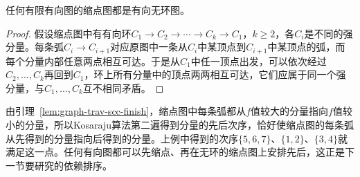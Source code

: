 \begin{theorem}[缩点图无环]
\label{thm:graph-trav-condensation-dag}
任何有限有向图的缩点图都是有向无环图。
\end{theorem}

\begin{proof}
假设缩点图中有有向环$C_1\to C_2\to\cdots\to C_k\to C_1$，$k\geq2$，各$C_i$是不同的强分量。每条弧$C_i\to C_{i+1}$对应原图中一条从$C_i$中某顶点到$C_{i+1}$中某顶点的弧，而每个分量内部任意两点相互可达。于是从$C_1$中任一顶点出发，可以依次经过$C_2,\ldots,C_k$再回到$C_1$，环上所有分量中的顶点两两相互可达，它们应属于同一个强分量，与$C_1,\ldots,C_k$互不相同矛盾。
\end{proof}

由引理~\ref{lem:graph-trav-scc-finish}，缩点图中每条弧都从$f$值较大的分量指向$f$值较小的分量，所以Kosaraju算法第二遍得到分量的先后次序，恰好使缩点图的每条弧从先得到的分量指向后得到的分量。上例中得到的次序$\{5,6,7\}$、$\{1,2\}$、$\{3,4\}$就满足这一点。任何有向图都可以先缩点、再在无环的缩点图上安排先后，这正是下一节要研究的依赖排序。
